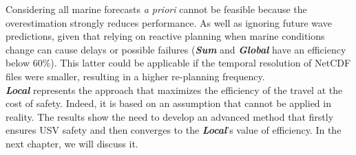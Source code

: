 Considering all marine forecasts \textit{a priori} cannot be feasible because the overestimation strongly reduces performance. As well as ignoring future wave predictions, given that relying on reactive planning when marine conditions change can cause delays or possible failures (\textbf{\textit{Sum}} and \textbf{\textit{Global}} have an efficiency below 60\%). This latter could be applicable if the temporal resolution of NetCDF files were smaller, resulting in a higher re-planning frequency.\\ \textbf{\textit{Local}} represents the approach that maximizes the efficiency of the travel at the cost of safety. Indeed, it is based on an assumption that cannot be applied in reality. The results show the need to develop an advanced method that firstly ensures USV safety and then converges to the \textbf{\textit{Local}}'s value of efficiency. In the next chapter, we will discuss it.


